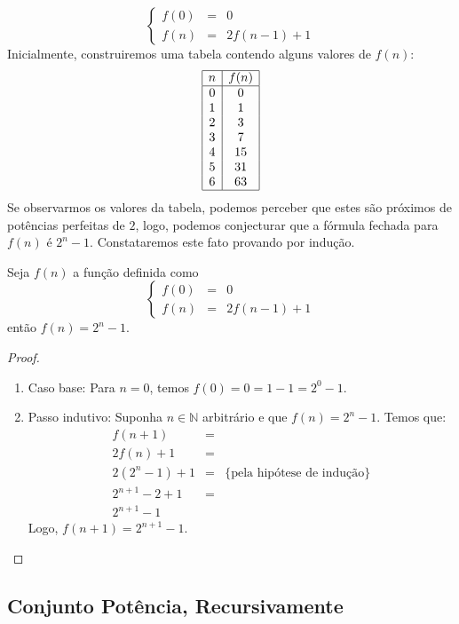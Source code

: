 \[
\left\{
\begin{array}{lcl}
    f(0) & = & 0\\
    f(n) & = & 2f(n - 1) + 1
\end{array}
\right.
\]
Inicialmente, construiremos uma tabela contendo alguns valores de
$f(n)$:
\[
\begin{array}{|c|c|}
  \hline
  n & f(n) \\ \hline
  0 &  0 \\
  1 &  1 \\
  2 &  3 \\
  3 &  7 \\
  4 & 15 \\
  5 & 31\\
  6 & 63 \\ \hline
\end{array}
\]
Se observarmos os valores da tabela, podemos perceber que estes são
próximos de potências perfeitas de $2$, logo, podemos conjecturar que
a fórmula fechada para $f(n)$ é $2^n - 1$. Constataremos este fato
provando por indução.
\begin{Theorem}\label{thmhanoi}
Seja $f(n)$ a função definida como
\[
\left\{
\begin{array}{lcl}
    f(0) & = & 0\\
    f(n) & = & 2f(n - 1) + 1
\end{array}
\right.
\]
então $f(n) = 2^n - 1$.
\end{Theorem}
\begin{proof}
\verb| |\\
\begin{enumerate}
  \item[\ ]Caso base: Para $n = 0$, temos $f(0) = 0 = 1 - 1 = 2^0 - 1$.
  \item[\ ]Passo indutivo: Suponha $n\in\mathbb{N}$ arbitrário e que
    $f(n) = 2^n - 1$. Temos que:
\[
\begin{array}{lcl}
    f(n + 1) & = & \\
    2f(n) + 1 & = & \\
    2(2^n - 1) + 1 & = & \{\text{pela hipótese de indução}\}\\
    2^{n+1} - 2 + 1 & = &\\
    2^{n+1} - 1
\end{array}
\]
Logo, $f(n + 1) = 2^{n + 1} - 1$.
\end{enumerate}
\end{proof}

\subsection{Conjunto Potência, Recursivamente}

